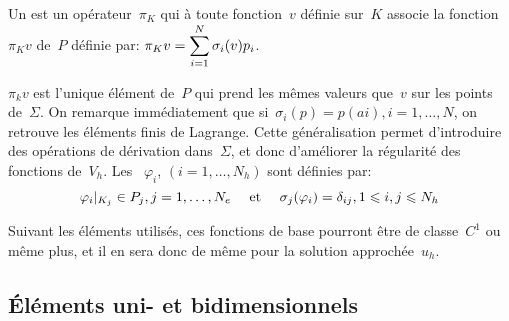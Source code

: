 \medskip
\begin{definition}
Un  est un opérateur~$\pi_K$ qui à toute fonction~$v$ définie sur~$K$ associe la fonction~$\pi_Kv$ de~$P$ définie par:
$\colorred\pi_Kv=\dsum_{i=1}^N \sigma_i(v)p_i$.
\end{definition}
\medskip
$\pi_kv$ est l'unique élément de~$P$ qui prend les mêmes valeurs que~$v$ sur les points de~$\Sigma$.
\medskip
On remarque immédiatement que si~$\sigma_i(p) = p(ai), i=1,\ldots, N$, on retrouve les éléments finis de Lagrange. Cette généralisation permet d'introduire des opérations de dérivation dans~$\Sigma$, et donc d'améliorer la régularité des fonctions de~$V_h$.
\medskip
Les ~$\varphi_i$, $(i=1,\ldots, N_h)$ sont
définies par:
\begin{equation}
\varphi_i|_{K_j} \in P_j, j=1,\ldots, N_e \quad \text{ et } \quad \colorred
\sigma_j(\varphi_i)=\delta_{ij}, 1\le i,j\le N_h
\end{equation}

Suivant les éléments utilisés, ces fonctions de base pourront être de classe~$C^1$ ou même plus, et il en sera donc de même pour la solution approchée~$u_h$.


\medskip
\subsection{Éléments uni- et bidimensionnels}


